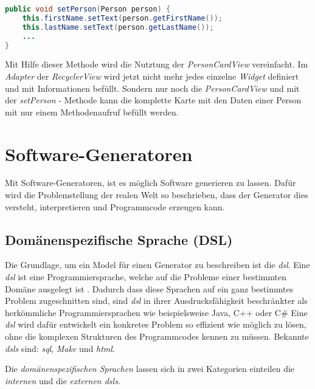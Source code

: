 \begin{lstlisting}[label=lst:setPerson,
language=java,
firstnumber=1,
caption=\textit{setPerson} - Methode aus der \textit{PersonCardView}.]				  
public void setPerson(Person person) {
	this.firstName.setText(person.getFirstName());
	this.lastName.setText(person.getLastName());	
	...
}
\end{lstlisting}

Mit Hilfe dieser Methode wird die Nutztung der \textit{PersonCardView} vereinfacht. Im \textit{Adapter} der \textit{RecyclerView} wird jetzt nicht mehr jedes einzelne \textit{Widget} definiert und mit Informationen befüllt. Sondern nur noch die \textit{PersonCardView} und mit der \textit{setPerson} - Methode kann die komplette Karte mit den Daten einer Person mit nur einem Methodenaufruf befüllt werden.

\section{Software-Generatoren}\label{sec:generators}

Mit Software-Generatoren, ist es möglich Software generieren zu lassen. Dafür wird die Problemstellung der realen Welt so beschrieben, dass der Generator dies versteht, interpretieren und Programmcode erzeugen kann.

\subsection{Domänenspezifische Sprache (DSL)}\label{sec:dsl}
Die Grundlage, um ein Model für einen Generator zu beschreiben ist die \textit{\acl{dsl}}.
Eine \textit{\acs{dsl}} ist eine Programmiersprache, welche auf die Probleme einer bestimmten Domäne ausgelegt ist \cite{dslHudak}. Dadurch dass diese Sprachen auf ein ganz bestimmtes Problem zugeschnitten sind, sind \textit{\acl{dsl}} in ihrer Ausdrucksfähigkeit beschränkter als herkömmliche Programmiersprachen wie beispielsweise Java, C++ oder C\# Eine \textit{\acl{dsl}} wird dafür entwickelt ein konkretes Problem so effizient wie möglich zu lösen, ohne die komplexen Strukturen des Programmcodes kennen zu müssen.
Bekannte \textit{\aclp{dsl}} sind: \textit{\ac{sql}}, \textit{Make} und \textit{\acf{html}}.

Die \textit{domänenspezifischen Sprachen} lassen sich in zwei Kategorien einteilen die \textit{internen} und die \textit{externen \acsp{dsl}}.

